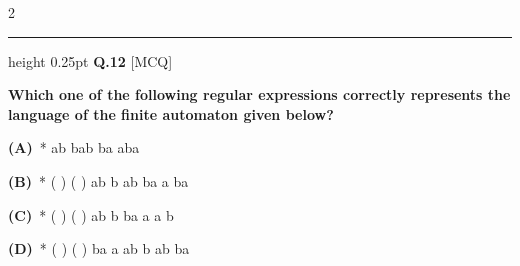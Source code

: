 \documentclass[a4paper,10pt,twoside]{article}
\begin{document}
\begin{multicols}{2}
\par\vspace{6pt}\hrule height 0.25pt\vspace{6pt}
\noindent\textbf{Q.12} \hfill {\footnotesize\textsf{[MCQ]}}
\par\vspace{2pt}
{\bfseries Which one of the following regular expressions correctly represents the language
of the finite automaton given below? \par}
\par\vspace{2pt}\noindent
\textbf{(A)}~* \newline * \newline * \newline * \newline ab bab \newline ba aba \newline \par\vspace{2pt}\noindent
\textbf{(B)}~* \newline * \newline * \newline * \newline * \newline * \newline ( \newline ) \newline ( \newline ) \newline ab b ab \newline ba a ba \newline \par\vspace{2pt}\noindent
\textbf{(C)}~* \newline * \newline * \newline * \newline * \newline ( \newline ) ( \newline ) \newline ab b \newline ba a \newline a \newline b \newline  \newline \par\vspace{2pt}\noindent
\textbf{(D)}~* \newline * \newline * \newline * \newline * \newline ( \newline ) ( \newline ) \newline ba a \newline ab b \newline ab \newline ba \newline  \newline 

\end{multicols}
\end{document}

